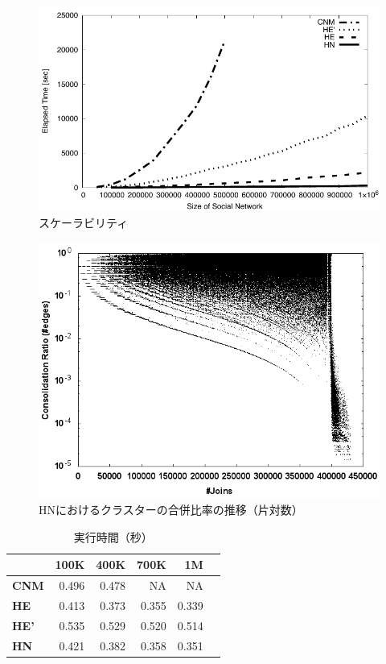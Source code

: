 \documentclass [a4j,11pt] {jsarticle}
\begin{document}
\begin {figure}[htbp]
  \centerline {\includegraphics [width=0.80\linewidth]{fig5-all-etime-size.pdf}}
  \caption {スケーラビリティ}
  \label {fig: scalability}
\end{figure}

\begin {figure}[htbp]
  \centerline {\includegraphics [width=0.80\linewidth]{fig7-hn-ratio-join-500K.png}}
  \caption {HNにおけるクラスターの合併比率の推移（片対数）}
  \label {fig: cluster move}
\end{figure}

\begin {table}
  \caption {実行時間（秒）}
  \label {tbl: compete module}
  \begin {center}
    \begin {tabular}{lrrrrr} \\ \hline
          & 100K & 400K & 700K & 1M \\ \hline
      \textbf {CNM}& 0.496 & 0.478 & NA & NA \\
      \textbf {HE}  & 0.413  & 0.373  & 0.355  & 0.339 \\
      \textbf {HE'} & 0.535  & 0.529 & 0.520 & 0.514 \\
      \textbf {HN}  & 0.421 & 0.382 & 0.358  & 0.351 \\
      \hline
    \end {tabular}
  \end {center}
\end {table}
\end{document}
